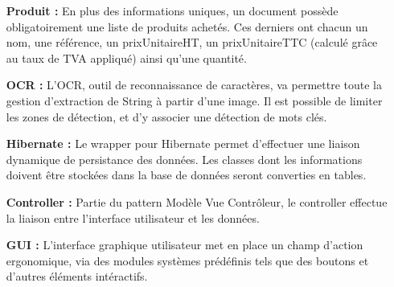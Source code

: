 \begin{itemize}
 \item[{\bf Produit :}] En plus des informations uniques, un document possède obligatoirement une liste de produits achetés. Ces derniers ont chacun un nom, une référence, un prixUnitaireHT, un prixUnitaireTTC (calculé grâce au taux de TVA appliqué) ainsi qu'une quantité.\\
  
 \item[{\bf OCR :}] L'OCR, outil de reconnaissance de caractères, va permettre toute la gestion d'extraction de String à partir d'une image. Il est possible de limiter les zones de détection, et d'y associer une détection de mots clés.\\
  
 \item[{\bf Hibernate :}] Le wrapper pour Hibernate permet d'effectuer une liaison dynamique de persistance des données. Les classes dont les informations doivent être stockées dans la base de données seront converties en tables.\\
  
 \item[{\bf Controller :}] Partie du pattern Modèle Vue Contrôleur, le controller effectue la liaison entre l'interface utilisateur et les données.\\
  
 \item[{\bf GUI :}] L'interface graphique utilisateur met en place un champ d'action ergonomique, via des modules systèmes prédéfinis tels que des boutons et d'autres éléments intéractifs.
\end{itemize}


